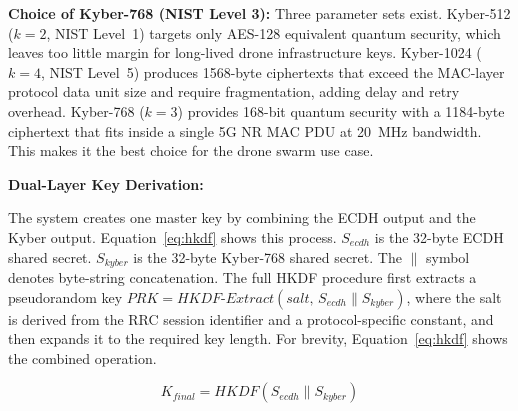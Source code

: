 \documentclass{ieeeaccess}
\begin{document}
\begin{table}[ht]
\centering
\caption{Key Exchange Overhead Comparison}
\label{tab:ke-overhead}
\end{table}

\textbf{Choice of Kyber-768 (NIST Level 3):} Three parameter sets exist. Kyber-512 ($k=2$, NIST Level~1) targets only AES-128 equivalent quantum security, which leaves too little margin for long-lived drone infrastructure keys. Kyber-1024 ($k=4$, NIST Level~5) produces 1568-byte ciphertexts that exceed the MAC-layer protocol data unit size and require fragmentation, adding delay and retry overhead. Kyber-768 ($k=3$) provides 168-bit quantum security with a 1184-byte ciphertext that fits inside a single 5G NR MAC PDU at 20~MHz bandwidth. This makes it the best choice for the drone swarm use case.

\vspace{2mm}\noindent\textbf{Dual-Layer Key Derivation:}

The system creates one master key by combining the ECDH output and the Kyber output. Equation~\ref{eq:hkdf} shows this process. $S_{ecdh}$ is the 32-byte ECDH shared secret. $S_{kyber}$ is the 32-byte Kyber-768 shared secret. The $\|$ symbol denotes byte-string concatenation. The full HKDF procedure \cite{ref14} first extracts a pseudorandom key $\mathit{PRK} = \mathit{HKDF}\text{-}\mathit{Extract}(\mathit{salt},\, S_{ecdh} \| S_{kyber})$, where the salt is derived from the RRC session identifier and a protocol-specific constant, and then expands it to the required key length. For brevity, Equation~\ref{eq:hkdf} shows the combined operation.

\begin{equation}
K_{final} = \mathit{HKDF}(S_{ecdh} \| S_{kyber})
\label{eq:hkdf}
\end{equation}
\end{document}
